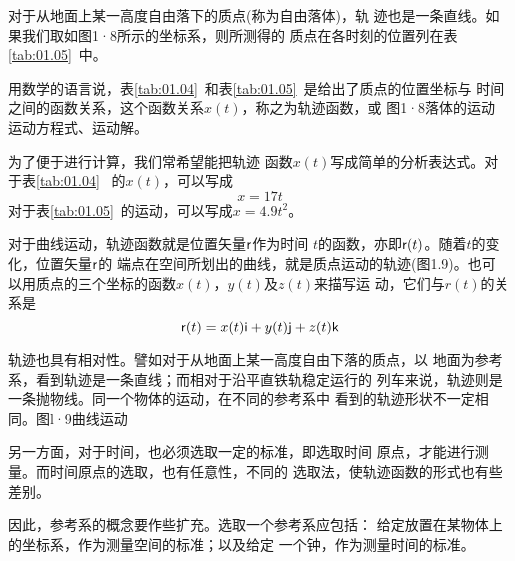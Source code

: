 对于从地面上某一高度自由落下的质点(称为自由落体)，轨
迹也是一条直线。如果我们取如图1·8所示的坐标系，则所测得的
质点在各时刻的位置列在表\ref{tab:01.05}~中。
\begin{table}[!h]
    \vspace{-0.5em}
    \caption{}
    \label{tab:01.05}
    \centering
    \vspace{-1.2em}
\end{table}

用数学的语言说，表\ref{tab:01.04}~和表\ref{tab:01.05}~是给出了质点的位置坐标与
时间之间的函数关系，这个函数关系$x(t)$，称之为轨迹函数，或
图1·8落体的运动
运动方程式、运动解。

为了便于进行计算，我们常希望能把轨迹
函数$x(t)$写成简单的分析表达式。对于表\ref{tab:01.04}~
的$x(t)$，可以写成
\begin{equation}\label{equ:01.05.01}
    x=17t
\end{equation}
对于表\ref{tab:01.05}~的运动，可以写成$x=4.9t^2$。

对于曲线运动，轨迹函数就是位置矢量${\sf r}$作为时间
$t$的函数，亦即${\sf r}(t)$。随着$t$的变化，位置矢量${\sf r}$的
端点在空间所划出的曲线，就是质点运动的轨迹(图1.9)。也可
以用质点的三个坐标的函数$x(t)$，$y(t)$及$z(t)$来描写运
动，它们与$r(t)$的关系是
\begin{equation}\label{equ:01.05.02}
    {\sf r}(t)=x(t){\sf i}+y(t){\sf j}+z(t){\sf k}
\end{equation}

轨迹也具有相对性。譬如对于从地面上某一高度自由下落的质点，以
地面为参考系，看到轨迹是一条直线；而相对于沿平直铁轨稳定运行的
列车来说，轨迹则是一条抛物线。同一个物体的运动，在不同的参考系中
看到的轨迹形状不一定相同。图l·9曲线运动

另一方面，对于时间，也必须选取一定的标准，即选取时间
原点，才能进行测量。而时间原点的选取，也有任意性，不同的
选取法，使轨迹函数的形式也有些差别。

因此，参考系的概念要作些扩充。选取一个参考系应包括：
给定放置在某物体上的坐标系，作为测量空间的标准；以及给定
一个钟，作为测量时间的标准。